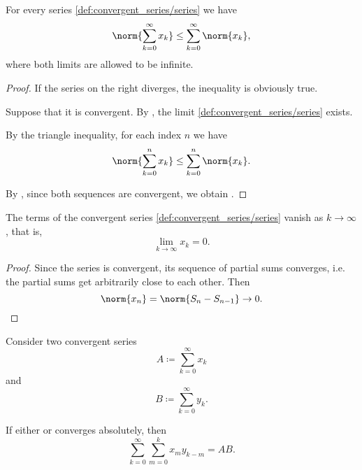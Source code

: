 \begin{proposition}\label{thm:infinitary_triangle_inequality}
  For every series \eqref{def:convergent_series/series} we have
  \begin{equation}\label{thm:infinitary_triangle_inequality/inequality}
    \norm{\sum_{k=0}^\infty x_k} \leq \sum_{k=0}^\infty \norm{x_k},
  \end{equation}
  where both limits are allowed to be infinite.
\end{proposition}
\begin{proof}
  If the series on the right diverges, the inequality is obviously true.

  Suppose that it is convergent. By , the limit
  \eqref{def:convergent_series/series} exists.

  By the triangle inequality, for each index \( n \) we have
  \begin{equation*}
    \norm{\sum_{k=0}^n x_k} \leq \sum_{k=0}^n \norm{x_k}.
  \end{equation*}

  By , since both sequences are convergent, we obtain .
\end{proof}

\begin{proposition}\label{thm:convergent_series_terms_vanish}
  The terms of the convergent series \eqref{def:convergent_series/series} vanish as \( k \to \infty \), that is,
  \begin{equation*}
    \lim_{k \to \infty} x_k = 0.
  \end{equation*}
\end{proposition}
\begin{proof}
  Since the series is convergent, its sequence of partial sums converges, i.e. the partial sums get arbitrarily close to each other. Then
  \begin{equation*}
    \norm{x_n} = \norm{S_n - S_{n-1}} \to 0.
  \end{equation*}
\end{proof}

\begin{theorem}\label{thm:product_of_series_convergence}
  Consider two convergent series
  \begin{equation}\label{thm:product_of_series_convergence/a}
    A \coloneqq \sum_{k=0}^\infty x_k
  \end{equation}
  and
  \begin{equation}\label{thm:product_of_series_convergence/b}
    B \coloneqq \sum_{k=0}^\infty y_k.
  \end{equation}

  If either  or  converges absolutely, then
  \begin{equation}\label{thm:product_of_series_convergence/prod}
    \sum_{k=0}^\infty \sum_{m=0}^k x_m y_{k-m} = AB.
  \end{equation}
\end{theorem}

